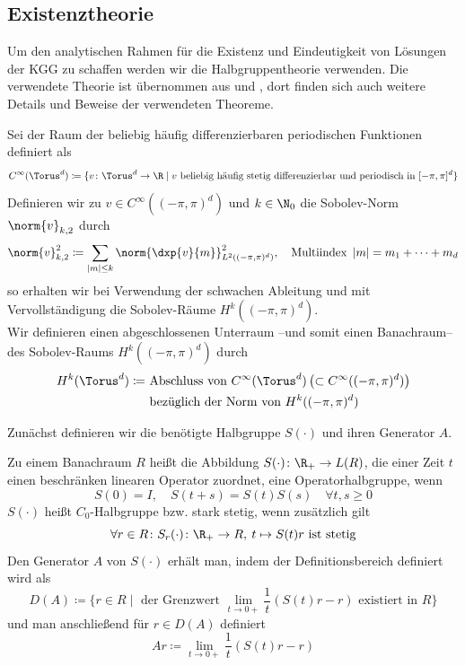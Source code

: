 \subsection{Existenztheorie}
\label{chapter:existencetheory}
Um den analytischen Rahmen für die Existenz und Eindeutigkeit von Lösungen der KGG zu schaffen werden wir die Halbgruppentheorie verwenden. Die verwendete Theorie ist übernommen aus \autocite{HundSchnau} und \autocite{EngelNagel}, dort finden sich auch weitere Details und Beweise der verwendeten Theoreme.
\begin{mathdef}
Sei der Raum der beliebig häufig differenzierbaren periodischen Funktionen definiert als
\[C^\infty (\Torus^d)\coloneqq \lbrace v\colon \Torus^d\to\R \mid v \text{ beliebig häufig stetig differenzierbar und periodisch in }[-\pi,\pi]^d\rbrace\]
Definieren wir zu $v\in C^\infty((-\pi,\pi)^d)$ und $k\in\N_0$ die Sobolev-Norm $\norm{v}_{k,2}$ durch
\[\norm{v}_{k,2}^2\coloneqq \sum_{|m|\le k}\norm{\dxp{v}{m}}_{L^2((-\pi,\pi)^d)}^2,\quad \text{Multiindex }\, |m|=m_1+\dots + m_d\]
so erhalten wir bei Verwendung der schwachen Ableitung und mit Vervollständigung die Sobolev-Räume $H^k((-\pi,\pi)^d)$.\\
Wir definieren einen abgeschlossenen Unterraum --und somit einen Banachraum-- des Sobolev-Raums $H^k((-\pi,\pi)^d)$ durch
\begin{align*}H^k(\Torus^d)\coloneqq &\text{ Abschluss von } C^\infty(\Torus^d)\left(\subset C^\infty((-\pi,\pi)^d)\right)\\
&\text{ bezüglich der Norm von } H^k((-\pi,\pi)^d)
\end{align*}
\end{mathdef}
Zunächst definieren wir die benötigte Halbgruppe $S(\cdot)$ und ihren Generator $A$.
\begin{mathdef}
Zu einem Banachraum $R$ heißt die Abbildung $S(\cdot)\colon \R_+\to L(R)$, die einer Zeit $t$ einen beschränken linearen Operator zuordnet, eine Operatorhalbgruppe, wenn
\[S(0)=I,\quad S(t+s)=S(t)S(s)\quad \forall t,s\ge 0\]
$S(\cdot)$ heißt $C_0$-Halbgruppe bzw. stark stetig, wenn zusätzlich gilt
\[\forall r\in R\colon S_r(\cdot)\colon \R_+\to R,\: t\mapsto S(t)r \text{ ist stetig}\]
Den Generator $A$ von $S(\cdot)$ erhält man, indem der Definitionsbereich definiert wird als
\[D(A)\coloneqq \lbrace r\in R\mid \text{ der Grenzwert } \lim\limits_{t\to0+}\frac{1}{t}(S(t)r-r)\text { existiert in }R\rbrace\]
und man anschließend für $r\in D(A)$ definiert
\[Ar\coloneqq \lim\limits_{t\to0+}\frac{1}{t}(S(t)r-r)\]
\end{mathdef}
